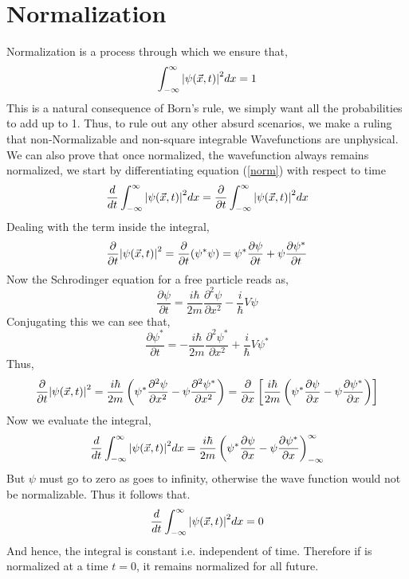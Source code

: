 \section{Normalization}
Normalization is a process through which we ensure that,
\begin{equation}\label{norm}
	\int_{- \infty}^{\infty} \abs{\psi(\vec{x}, t)}^{2} dx = 1
\end{equation}
This is a natural consequence of Born's rule, we simply want all the probabilities to add up to 1. Thus, to rule out any other absurd scenarios, we make a ruling that non-Normalizable and non-square integrable Wavefunctions are unphysical.\\
We can also prove that once normalized, the wavefunction always remains normalized, we start by differentiating equation (\ref{norm}) with respect to time\\
$$\frac{d}{dt} \int_{- \infty}^{\infty} \abs{\psi(\vec{x}, t)}^{2} dx = \frac{\partial}{\partial t}\int_{- \infty}^{\infty} \abs{\psi(\vec{x}, t)}^{2} dx$$
Dealing with the term inside the integral,
$$ \frac{\partial}{\partial t}\abs{\psi(\vec{x}, t)}^{2} = \frac{\partial}{\partial t} (\psi^{*} \psi ) = \psi^{*}\frac{\partial \psi}{\partial t} + \psi\frac{\partial \psi^{*}}{\partial t}$$
Now the Schrodinger equation for a free particle reads as,
$$\frac{\partial \psi}{\partial t} = \frac{i \hbar}{2m}\frac{\partial^{2} \psi}{\partial x^{2}} - \frac{i}{\hbar}V \psi$$
Conjugating this we can see that,
$$\frac{\partial \psi^{*}}{\partial t} = -\frac{i \hbar}{2m}\frac{\partial^{2} \psi^{*}}{\partial x^{2}} + \frac{i}{\hbar}V \psi^{*}$$
Thus,
$$\frac{\partial}{\partial t}\abs{\psi(\vec{x}, t)}^{2} = \frac{i \hbar}{2m}\left( \psi^{*} \frac{\partial^{2} \psi}{\partial x^{2}} - \psi \frac{\partial^{2} \psi^{*}}{\partial x^{2}} \right) = \frac{\partial }{\partial x}\left[\frac{i \hbar}{2m}\left( \psi^{*} \frac{\partial \psi}{\partial x} - \psi \frac{\partial \psi^{*}}{\partial x} \right)\right]$$
Now we evaluate the integral,
$$\frac{d}{dt} \int_{- \infty}^{\infty} \abs{\psi(\vec{x}, t)}^{2} dx = \frac{i \hbar}{2m}\left( \psi^{*} \frac{\partial \psi}{\partial x} - \psi \frac{\partial \psi^{*}}{\partial x} \right)^{\infty}_{- \infty} $$
But $\psi$ must go to zero as goes to infinity, otherwise the wave function would not be normalizable. Thus it follows that.
\begin{equation}
	\frac{d}{dt} \int_{- \infty}^{\infty} \abs{\psi(\vec{x}, t)}^{2} dx = 0
\end{equation}
And hence, the integral is constant i.e. independent of time. Therefore if is normalized at a time $t = 0$, it remains normalized for all future. 
